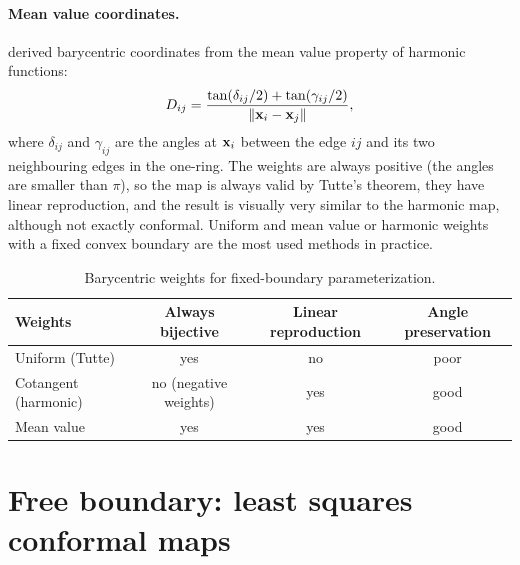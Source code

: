 \paragraph{Mean value coordinates.} \citet{Floater2003} derived barycentric coordinates from the
mean value property of harmonic functions:
\begin{equation}
D_{ij}=\frac{\tan(\delta_{ij}/2)+\tan(\gamma_{ij}/2)}{\left\lVert \mathbf{x}_i-\mathbf{x}_j\right\rVert},
\end{equation}
where $\delta_{ij}$ and $\gamma_{ij}$ are the angles at $\mathbf{x}_i$ between the edge $ij$ and its two
neighbouring edges in the one-ring. The weights are always positive (the angles are smaller than
$\pi$), so the map is always valid by Tutte's theorem, they have linear reproduction, and the result
is visually very similar to the harmonic map, although not exactly conformal. Uniform and mean
value or harmonic weights with a fixed convex boundary are the most used methods in practice.

\begin{table}[tbp]
\centering\small
\begin{tabular}{@{}lccc@{}}
\toprule
Weights & Always bijective & Linear reproduction & Angle preservation \\
\midrule
Uniform (Tutte) & yes & no & poor \\
Cotangent (harmonic) & no (negative weights) & yes & good \\
Mean value & yes & yes & good \\
\bottomrule
\end{tabular}
\caption{Barycentric weights for fixed-boundary parameterization.}
\label{tab:weights}
\end{table}


\section{Free boundary: least squares conformal maps}

